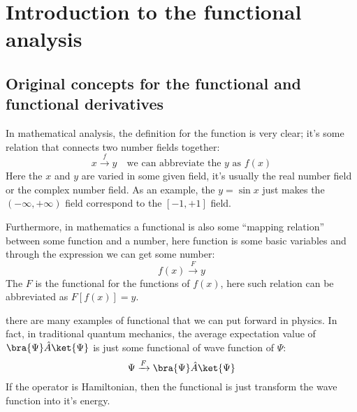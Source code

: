 %
% 
%
%

%




    
\chapter{Introduction to the functional analysis}
%
%
%
%
%
%
\section{Original concepts for the functional and functional
  derivatives}
%
%  
%
%
In mathematical analysis, the definition for the function is very
clear; it's some relation that connects two number fields together:
\begin{equation}\label{eq:functional:1}
  x \xrightarrow{f}  y \quad \text{we can abbreviate the $y$ as $f(x)$}
\end{equation}
Here the $x$ and $y$ are varied in some given field, it's usually the
real number field or the complex number field. As an example, the $y =
\sin x$ just makes the $ (-\infty, +\infty)$ field correspond to the
$[-1, +1]$ field.

Furthermore, in mathematics a functional is also some ``mapping
relation'' between some function and a number, here function is some
basic variables and through the expression we can get some number:
\begin{equation}\label{eq:functional:2}
  f(x) \xrightarrow{F} y
\end{equation}
The $F$ is the functional for the functions of $f(x)$, here such
relation can be abbreviated as $F[f(x)] = y$.

there are many examples of functional that we can put forward in
physics. In fact, in traditional quantum mechanics, the average
expectation value of $\bra{\Psi}\hat{A}\ket{\Psi}$ is just some
functional of wave function of $\Psi$:
\begin{equation}\label{eq:functional:3}
  \Psi \xrightarrow{F} \bra{\Psi}\hat{A}\ket{\Psi}
\end{equation}
If the operator is Hamiltonian, then the functional is just transform
the wave function into it's energy.

